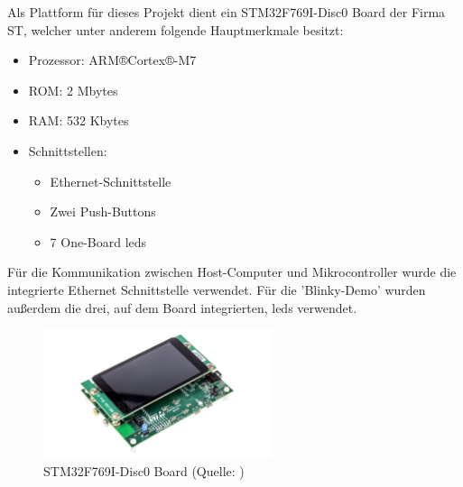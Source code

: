 \documentclass[../EDF Master Thesis.tex]{subfiles}
\begin{document}
Als Plattform für dieses Projekt dient ein STM32F769I-Disc0 Board der Firma ST, welcher unter anderem folgende Hauptmerkmale besitzt:

\begin{itemize}
    \item Prozessor: ARM®Cortex®-M7
    \item ROM: 2 Mbytes
    \item RAM: 532 Kbytes
    \item Schnittstellen:
    \begin{itemize}
        \item Ethernet-Schnittstelle
        \item Zwei Push-Buttons
        \item 7 One-Board \ac{led}s
    \end{itemize}
\end{itemize}

Für die Kommunikation zwischen Host-Computer und Mikrocontroller wurde die integrierte Ethernet Schnittstelle verwendet.
Für die 'Blinky-Demo' wurden außerdem die drei, auf dem Board integrierten, \ac{led}s verwendet.

\begin{figure}[ht!]
    \begin{center}
        \includegraphics[width=0.6\textwidth]{attachments/stm32f769i-disc0.pdf}
    \end{center}
    \caption[STM32F769I-Disc0 Board]{STM32F769I-Disc0 Board (Quelle: \cite{stm:001})}
    \label{fig:STM32F769I-Disc0_board}
\end{figure}
\end{document}
